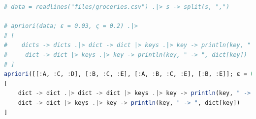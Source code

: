 \documentclass[a4paper]{article}
\begin{document}
\begin{lstlisting}[language=julia]
# data = readlines("files/groceries.csv") .|> s -> split(s, ",")

# apriori(data; ε = 0.03, ς = 0.2) .|> 
# [
#    dicts -> dicts .|> dict -> dict |> keys .|> key -> println(key, " -> ", dict[key]),
#     dict -> dict |> keys .|> key -> println(key, " -> ", dict[key])
# ]
apriori([[:A, :C, :D], [:B, :C, :E], [:A, :B, :C, :E], [:B, :E]]; ε = 0.5) .|>
[
    dict -> dict .|> dict -> dict |> keys .|> key -> println(key, " -> ", dict[key]),
    dict -> dict |> keys .|> key -> println(key, " -> ", dict[key])
]

\end{lstlisting}

\end{document}
